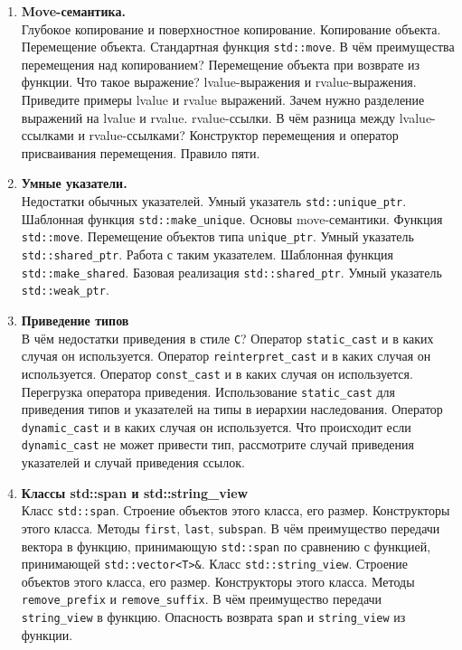 \documentclass{article}
\begin{document}
\begin{enumerate}
\item \textbf{Move-семантика.}\\
Глубокое копирование и поверхностное копирование. Копирование объекта. Перемещение объекта. Стандартная функция \texttt{std::move}. В чём преимущества перемещения над копированием? Перемещение объекта при возврате из функции. Что такое выражение? lvalue-выражения и rvalue-выражения. Приведите примеры lvalue и rvalue выражений. Зачем нужно разделение выражений на lvalue и rvalue. rvalue-ссылки. В чём разница между lvalue-ссылками и rvalue-ссылками? Конструктор перемещения и оператор присваивания перемещения. Правило пяти.

\item \textbf{Умные указатели.}\\
Недостатки обычных указателей. Умный указатель \texttt{std::unique\_ptr}. Шаблонная функция \texttt{std::make\_unique}. Основы move-семантики. Функция \texttt{std::move}. Перемещение объектов типа \texttt{unique\_ptr}. Умный указатель \texttt{std::shared\_ptr}. Работа с таким указателем. Шаблонная функция \texttt{std::make\_shared}. Базовая реализация \texttt{std::shared\_ptr}. Умный указатель \texttt{std::weak\_ptr}.

\item \textbf{Приведение типов}\\
В чём недостатки приведения в стиле \texttt{C}? Оператор \texttt{static\_cast} и в каких случая он используется. Оператор \texttt{reinterpret\_cast} и в каких случая он используется. Оператор \texttt{const\_cast} и в каких случая он используется. Перегрузка оператора приведения. Использование \texttt{static\_cast} для приведения типов и указателей на типы в иерархии наследования. Оператор \texttt{dynamic\_cast} и в каких случая он используется. Что происходит если \texttt{dynamic\_cast} не может привести тип, рассмотрите случай приведения указателей и случай приведения ссылок.

\item \textbf{Классы std::span и std::string\_view}\\
Класс \texttt{std::span}. Строение объектов этого класса, его размер. Конструкторы этого класса. Методы \texttt{first}, \texttt{last}, \texttt{subspan}. В чём преимущество передачи вектора в функцию, принимающую \texttt{std::span} по сравнению с функцией, принимающей \texttt{std::vector<T>\&}. Класс \texttt{std::string\_view}. Строение объектов этого класса, его размер. Конструкторы этого класса. Методы \texttt{remove\_prefix} и \texttt{remove\_suffix}. В чём преимущество передачи \texttt{string\_view} в функцию. Опасность возврата \texttt{span} и \texttt{string\_view} из функции.

\end{enumerate}
\end{document}
